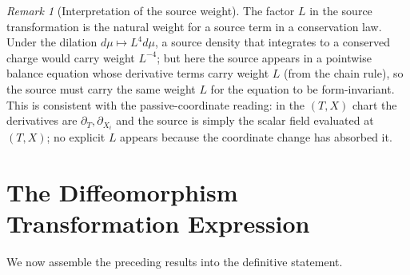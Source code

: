 \documentclass[11pt]{article}
\theoremstyle{definition}
\theoremstyle{remark}
\newtheorem{remark}[theorem]{Remark}
\begin{document}
\begin{remark}[Interpretation of the source weight]
The factor $L$ in the source transformation is the natural weight for a
source term in a conservation law.  Under the dilation $d\mu\mapsto L^4d\mu$,
a source density that integrates to a conserved charge would carry weight
$L^{-4}$; but here the source appears in a pointwise balance equation whose
derivative terms carry weight $L$ (from the chain rule), so the source must
carry the same weight $L$ for the equation to be form-invariant.  This is
consistent with the passive-coordinate reading: in the $(T,X)$ chart the
derivatives are $\partial_T,\partial_{X_i}$ and the source is simply the
scalar field evaluated at $(T,X)$; no explicit $L$ appears because the
coordinate change has absorbed it.
\end{remark}

\section{The Diffeomorphism Transformation Expression}
\label{sec:expression}

We now assemble the preceding results into the definitive statement.
\end{document}
